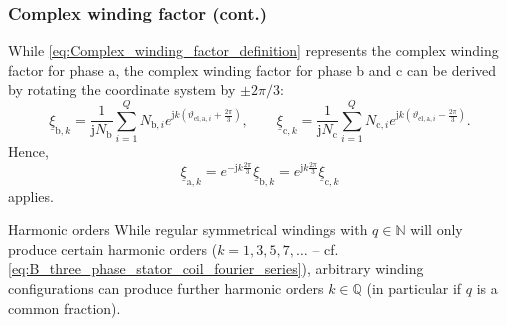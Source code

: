 \begin{frame}
	\frametitle{Complex winding factor (cont.)}
	While \eqref{eq:Complex_winding_factor_definition} represents the complex winding factor for phase a, the complex winding factor for phase b and c can be derived by rotating the coordinate system by $\pm 2\pi/3$:
	\begin{equation}
		\underline{\xi}_{\mathrm{b},k} = \frac{1}{\mathrm{j}N_\mathrm{b}}\sum_{i=1}^{Q} N_{\mathrm{b},i}e^{\mathrm{j}k\left(\vartheta_{\mathrm{el},\mathrm{a},i}+\frac{2\pi}{3}\right)}, \qquad  \underline{\xi}_{\mathrm{c},k} = \frac{1}{\mathrm{j}N_\mathrm{c}}\sum_{i=1}^{Q} N_{\mathrm{c},i}e^{\mathrm{j}k\left(\vartheta_{\mathrm{el},\mathrm{a},i}-\frac{2\pi}{3}\right)}.
		\label{eq:Complex_winding_factor_definition_phase_bc}
	\end{equation}
	\pause
	Hence,
	\begin{equation}
		\underline{\xi}_{\mathrm{a},k} = e^{-\mathrm{j}k\frac{2\pi}{3}}\underline{\xi}_{\mathrm{b},k} = e^{\mathrm{j}k\frac{2\pi}{3}}\underline{\xi}_{\mathrm{c},k}
		\label{eq:Complex_winding_factor_relation}
	\end{equation}
	applies.
	\pause
	\begin{varblock}{Harmonic orders}
		While regular symmetrical windings with $q\in\mathbb{N}$ will only produce certain harmonic orders ($k=1,3,5,7,\ldots$ -- cf. \eqref{eq:B_three_phase_stator_coil_fourier_series}), arbitrary winding configurations can produce further harmonic orders $k\in\mathbb{Q}$ (in particular if $q$ is a common fraction).
	\end{varblock}
\end{frame}

